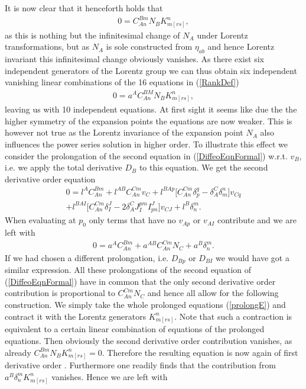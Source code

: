\documentclass[a4paper,12pt, DIV=14, BCOR=5mm, twoside, headsepline, numbers=noenddot]{scrbook}
\begin{document}
It is now clear that it henceforth holds that
\begin{align}
    0 = C^{Bm}_{An}N_B K_{m[rs]}^n,
\end{align}
as this is nothing but the infinitesimal change of $N_A$ under Lorentz transformations, but as $N_A$ is sole constructed from $\eta_{ab}$ and hence Lorentz invariant this infinitesimal change obviously vanishes. As there exist six independent generators of the Lorentz group we can thus obtain six independent vanishing linear combinations of the 16 equations in (\ref{RankDef})
\begin{align}
    0 = a^A C^{BM}_{An}N_B K_{m[rs]}^n,
\end{align}
leaving us with 10 independent equations. At first sight it seems like due the the higher symmetry of the expansion points the equations are now weaker. This is however not true as the Lorentz invariance of the expansion point $N_A$ also influences the power series solution in higher order. To illustrate this effect we consider the prolongation of the second equation in (\ref{DiffeoEqnFormal}) w.r.t. $v_B$, i.e. we apply the total derivative $D_B$ to this equation. We get the second derivative order equation
\begin{multline}
    0 = l^AC_{An}^{Bm} + l^{AB}C_{An}^{Cm}v_C + l^{BAp} \bigl[ C_{An}^{Cm} \delta_p^q - \delta_A^C \delta_m^n \bigr] v_{Cq}\\
    + l^{BAI} \bigl[ C_{An}^{Cm} \delta_I^J - 2 \delta_A^C J_I^{pm} I^J_{pn}  \bigr] v_{CJ} + l^{B} \delta^m_n.
\end{multline}
When evaluating at $p_0$ only terms that have no $v_{Ap}$ or $v_{AI}$ contribute and we are left with 
\begin{align}\label{prolongE}
    0 = a^A C_{An}^{Bm} + a^{AB} C_{An}^{Cm} N_C +  a^B \delta^m_n.
\end{align}
If we had chosen a different prolongation, i.e. $D_{Bp}$ or $D_{BI}$ we would have got a similar expression. All these prolongations of the second equation of (\ref{DiffeoEqnFormal}) have in common that the only second derivative order contribution is proportional to $C^{Cm}_{An} N_C$ and hence all allow for the following construction. We simply take the whole prolonged equations (\ref{prolongE}) and contract it with the Lorentz generators $K_{m[rs]}^n$. Note that such a contraction is equivalent to a certain linear combination of equations of the prolonged equations. Then obviously the second derivative order contribution vanishes, as already $C_{An}^{Bm} N_B K_{m[rs]}^n = 0$.  Therefore the resulting equation is now again of first derivative order . Furthermore one readily finds that the contribution from $a^B \delta^m_n K_{m[rs]}^n$ vanishes. Hence we are left with 
\end{document}
